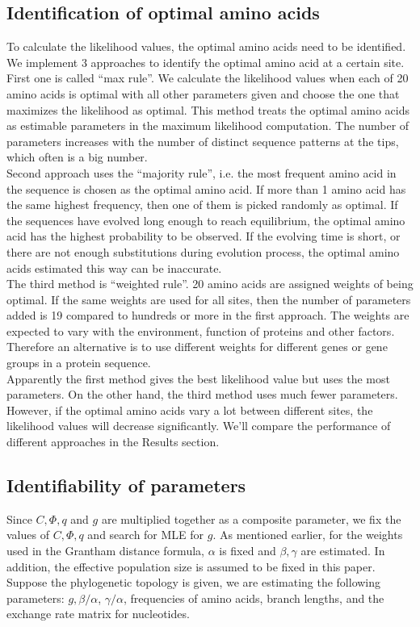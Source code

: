 \documentclass[13pt]{article}
\begin{document}
\subsection{Identification of optimal amino acids}
To calculate the likelihood values, the optimal amino acids need to be identified. We implement 3 approaches to identify the optimal amino acid at a certain site. First one is called ``max rule''. We calculate the likelihood values when each of 20 amino acids is optimal with all other parameters given and choose the one that maximizes the likelihood as optimal. This method treats the optimal amino acids as estimable parameters in the maximum likelihood computation. The number of parameters increases with the number of distinct sequence patterns at the tips, which often is a big number. \\
Second approach uses the ``majority rule'', i.e. the most frequent amino acid in the sequence is chosen as the optimal amino acid. If more than 1 amino acid has the same highest frequency, then one of them is picked randomly as optimal. If the sequences have evolved long enough to reach equilibrium, the optimal amino acid has the highest probability to be observed. If the evolving time is short, or there are not enough substitutions during evolution process, the optimal amino acids estimated this way can be inaccurate. \\
The third method is ``weighted rule''. 20 amino acids are assigned weights of being optimal. If the same weights are used for all sites, then the number of parameters added is 19 compared to hundreds or more in the first approach. The weights are expected to vary with the environment, function of proteins and other factors. Therefore an alternative is to use different weights for different genes or gene groups in a protein sequence. \\
Apparently the first method gives the best likelihood value but uses the most parameters. On the other hand, the third method uses much fewer parameters. However, if the optimal amino acids vary a lot between different sites, the likelihood values will decrease significantly. We'll compare the performance of different approaches in the Results section.\\

\subsection{Identifiability of parameters}
Since $C, \Phi, q$ and $g$ are multiplied together as a composite parameter, we fix the values of $C, \Phi, q$ and search for MLE for $g$. As mentioned earlier, for the weights used in the Grantham distance formula, $\alpha$ is fixed and $\beta, \gamma$ are estimated.  In addition, the effective population size is assumed to be fixed in this paper. Suppose the phylogenetic topology is given, we are estimating the following parameters: $g, \beta/\alpha$, $\gamma/\alpha$, frequencies of amino acids, branch lengths, and the exchange rate matrix for nucleotides. 
\end{document}
